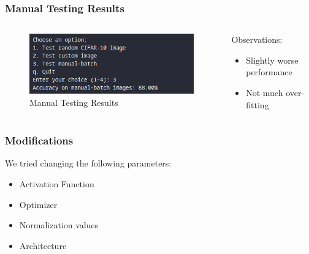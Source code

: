 \begin{frame}
\frametitle{Manual Testing Results}
\begin{columns}
    \begin{column}{0.5\textwidth}
        \begin{figure}
            \centering
            \includegraphics[width=1\textwidth]{media/1stAssignment/manual_batch.png}
            \caption{Manual Testing Results}
        \end{figure}
    \end{column}

    \begin{column}{0.5\textwidth}
        Observations:
        \begin{itemize}
            \item Slightly worse performance 
            \item Not much over-fitting
        \end{itemize}
    \end{column}
\end{columns}
\end{frame}

\begin{frame}
\frametitle{Modifications}
We tried changing the following parameters:
\begin{itemize}
    \item Activation Function
    \item Optimizer
    \item Normalization values
    \item Architecture
\end{itemize}
\end{frame}

